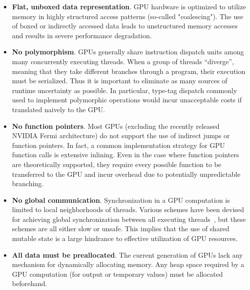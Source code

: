 \documentclass[preprint]{sigplanconf}
\begin{document}
\begin{itemize}
\item \textbf{Flat, unboxed data representation}. GPU hardware is optimized to
utilize memory in highly structured access patterns (so-called "coalescing"). 
The use of boxed or indirectly accessed data leads to 
unstructured memory accesses
and results in severe performance degradation.

\item \textbf{No polymorphism}. GPUs generally share instruction dispatch units
among many concurrently executing threads. When a group of threads
``diverge'', meaning that they take different branches through a program, their
execution must be serialized. Thus it is important to eliminate as many sources
of runtime uncertainty as possible. In particular, type-tag dispatch commonly
used to implement polymorphic operations would incur unacceptable costs if
translated naively to the GPU.

\item \textbf {No function pointers}. Most GPUs (excluding the recently released
NVIDIA Fermi architecture) do not support the use of indirect jumps or function
pointers. In fact, a common implementation strategy for GPU function calls is
extensive inlining. Even in the case where function pointers are theoretically
supported, they require every possible function to be transferred to the GPU and
incur overhead due to potentially unpredictable branching. 

\item \textbf{No global communication}. Synchronization in a GPU computation is
limited to local neighborhoods of threads. Various schemes have been devised for
achieving global synchronization between all executing threads~\cite{feng10},
but these schemes are all either slow or unsafe. This implies that the use of
shared mutable state is a large hindrance to effective utilization of GPU
resources.

\item \textbf{All data must be preallocated}. The current generation of GPUs
lack any mechanism for dynamically allocating memory. Any heap space required by
a GPU computation (for output or temporary values) must be allocated
beforehand. 
\end{itemize}
\end{document}
